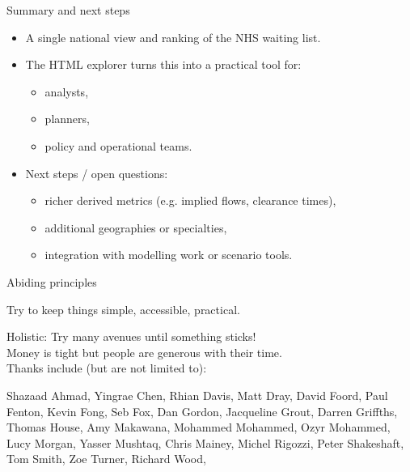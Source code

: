 \documentclass{beamer}
\begin{document}
\begin{frame}{Summary and next steps}
    \begin{itemize}
        \item A single national view and ranking of
            the NHS waiting list.
        \item The HTML explorer turns this into a practical tool for:
            \begin{itemize}
                \item analysts,
                \item planners,
                \item policy and operational teams.
            \end{itemize}
        \item Next steps / open questions:
            \begin{itemize}
                \item richer derived metrics (e.g. implied flows, clearance times),
                \item additional geographies or specialties,
                \item integration with modelling work or scenario tools.
            \end{itemize}
    \end{itemize}
\end{frame}


\begin{frame}{Abiding principles}

  {\Large Try to keep things simple, accessible, practical.}\\
  \vspace{1em}

  {\Large Holistic: Try many avenues until something sticks!}\\
  \vspace{1em}
  {\Large Money is tight but people are generous with their time.}\\
\vspace{1.5cm}
  Thanks include (but are not limited to):

  Shazaad Ahmad, Yingrae Chen, Rhian Davis, Matt Dray, David Foord, Paul Fenton, Kevin Fong, Seb Fox, Dan Gordon, Jacqueline Grout, Darren Griffths, Thomas House, Amy Makawana, Mohammed Mohammed, Ozyr Mohammed, Lucy Morgan,  Yasser Mushtaq, Chris Mainey, Michel Rigozzi, Peter Shakeshaft, Tom Smith, Zoe Turner, Richard Wood, 
\end{frame}
\end{document}
